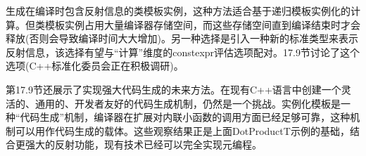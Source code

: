 生成在编译时包含反射信息的类模板实例，这种方法适合基于递归模板实例化的计算。但类模板实例占用大量编译器存储空间，而这些存储空间直到编译结束时才会释放(否则会导致编译时间大大增加)。另一种选择是引入一种新的标准类型来表示反射信息，该选择有望与“计算”维度的constexpr评估选项配对。17.9节讨论了这个选项(C++标准化委员会正在积极调研)。

第17.9节还展示了实现强大代码生成的未来方法。在现有C++语言中创建一个灵活的、通用的、开发者友好的代码生成机制，仍然是一个挑战。实例化模板是一种“代码生成”机制，编译器在扩展对内联小函数的调用方面已经足够可靠，这种机制可以用作代码生成的载体。这些观察结果正是上面DotProductT示例的基础，结合更强大的反射功能，现有技术已经可以完全实现元编程。











































